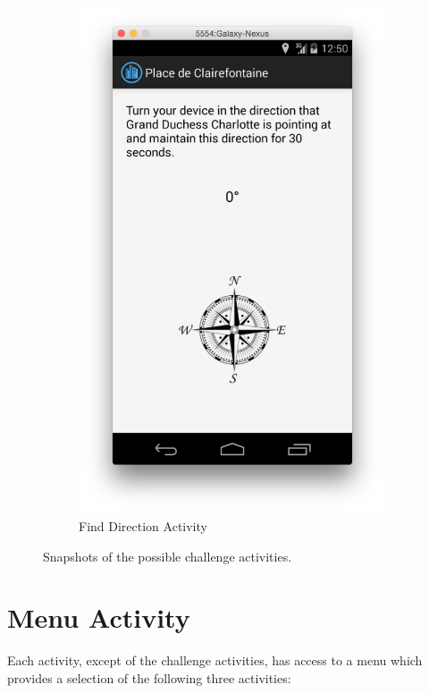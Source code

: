 \begin{figure}[H]
\begin{subfigure}[b]{0.3\textwidth}
                \includegraphics[width=\textwidth]{Figures/FindDirectionActivity}
                \caption{Find Direction Activity}
        \end{subfigure}
        \caption{Snapshots of the possible challenge activities.}
\end{figure}

\section{Menu Activity}

Each activity, except of the challenge activities, has access to a menu which provides a selection of the following three activities: 

